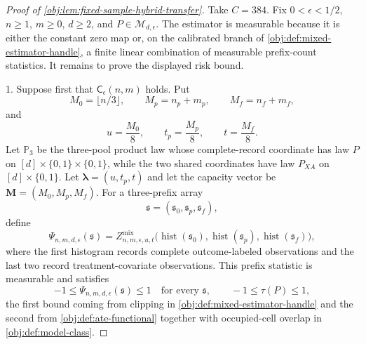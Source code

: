 \documentclass[11pt]{article}
\begin{document}
\begin{proof}[Proof of \cref{obj:lem:fixed-sample-hybrid-transfer}]
Take \(C=384\).  Fix \(0<\epsilon<1/2\), \(n\ge1\), \(m\ge0\), \(d\ge2\), and \(P\in\mathcal M_{d,\epsilon}\).  The estimator is measurable because it is either the constant zero map or, on the calibrated branch of \cref{obj:def:mixed-estimator-handle}, a finite linear combination of measurable prefix-count statistics.  It remains to prove the displayed risk bound. %

1. Suppose first that \(\mathsf C_\epsilon(n,m)\) holds.  Put
\[
M_0=\lfloor n/3\rfloor,\qquad
M_p=n_p+m_p,\qquad
M_f=n_f+m_f,
\]
and
\[
u=\frac{M_0}{8},\qquad t_p=\frac{M_p}{8},\qquad t=\frac{M_f}{8}.
\]
Let \(\mathbb P_3\) be the three-pool product law whose complete-record coordinate has law \(P\) on
\([d]\times\{0,1\}\times\{0,1\}\), while the two shared coordinates have law \(P_{XA}\) on
\([d]\times\{0,1\}\).  Let \(\boldsymbol\lambda=(u,t_p,t)\) and let the capacity vector be
\(\boldsymbol M=(M_0,M_p,M_f)\).  For a three-prefix array
\[
\mathfrak s=(\mathfrak s_0,\mathfrak s_p,\mathfrak s_f),
\]
define
\[
\Psi_{n,m,d,\epsilon}(\mathfrak s)
=
Z^{\mathrm{mix}}_{n,m,\epsilon,u,t}
\bigl(\operatorname{hist}(\mathfrak s_0),
      \operatorname{hist}(\mathfrak s_p),
      \operatorname{hist}(\mathfrak s_f)\bigr),
\]
where the first histogram records complete outcome-labeled observations and the last two record treatment-covariate observations.  This prefix statistic is measurable and satisfies
\[
-1\le \Psi_{n,m,d,\epsilon}(\mathfrak s)\le 1
\quad\text{for every }\mathfrak s,
\qquad
-1\le \tau(P)\le 1,
\]
the first bound coming from clipping in \cref{obj:def:mixed-estimator-handle} and the second from \cref{obj:def:ate-functional} together with occupied-cell overlap in \cref{obj:def:model-class}. %


\end{proof}
\end{document}
